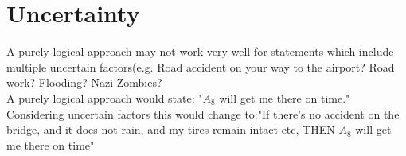 \section{Uncertainty}
A purely logical approach may not work very well for statements which include multiple uncertain factors(e.g. Road accident on your way to the airport? Road work? Flooding? Nazi Zombies?\\
A purely logical approach would state: "$A_8$ will get me there on time."\\
Considering uncertain factors this would change to:"If there's no accident on the bridge, and it does not rain, and my tires remain intact etc, THEN $A_8$ will get me there on time"\\